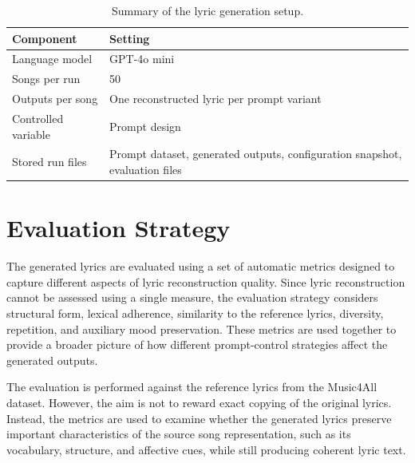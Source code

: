 \begin{table}[H]
\centering
\caption{Summary of the lyric generation setup.}
\label{tab:generation_setup}
\begin{tabular}{p{} p{}}
\hline
Component & Setting \\
\hline
Language model & GPT-4o mini \\
Songs per run & 50 \\
Outputs per song & One reconstructed lyric per prompt variant \\
Controlled variable & Prompt design \\
Stored run files & Prompt dataset, generated outputs, configuration snapshot, evaluation files \\
\hline
\end{tabular}
\end{table}


\section{Evaluation Strategy}

The generated lyrics are evaluated using a set of automatic metrics designed to capture different aspects of lyric reconstruction quality. Since lyric reconstruction cannot be assessed using a single measure, the evaluation strategy considers structural form, lexical adherence, similarity to the reference lyrics, diversity, repetition, and auxiliary mood preservation. These metrics are used together to provide a broader picture of how different prompt-control strategies affect the generated outputs.

The evaluation is performed against the reference lyrics from the Music4All dataset. However, the aim is not to reward exact copying of the original lyrics. Instead, the metrics are used to examine whether the generated lyrics preserve important characteristics of the source song representation, such as its vocabulary, structure, and affective cues, while still producing coherent lyric text.

